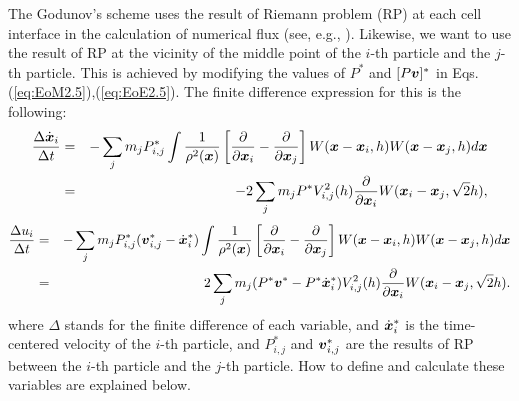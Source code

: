 \documentclass{cjour}
\newcommand{ \Vec   }[1]{ \mbox{\boldmath $ #1 $} }
\newcommand{ \PD    }[2]{ \frac{ \partial #1 }{ \partial #2 } }
\begin{document}
\begin{article}
The Godunov's scheme uses the result of 
Riemann problem (RP) at each cell interface in the calculation 
of numerical flux (see, e.g., \cite{vL:1979}).  
%
%
Likewise, we want to use the result of RP at the vicinity of 
the middle point of the $i$-th particle and the $j$-th particle. 
This is achieved by modifying the values of $P^*$ and $[P\Vec{v}]^*$ 
in Eqs. (\ref{eq:EoM2.5}),(\ref{eq:EoE2.5}).  
The finite difference expression for this is the following:
%
\begin{eqnarray}
                \frac{\Delta \dot{\Vec{x}}_i}{\Delta t} 
              & = &
              - \sum_{j} m_j
                         P^*_{i,j}
                         \int \frac{1}{ \rho^2(\Vec{x}) }
                             \left[  \PD{}{\Vec{x}_i} 
                                   - \PD{}{\Vec{x}_j}  \right]
                         W(\Vec{x}-\Vec{x}_i, h)
                         W(\Vec{x}-\Vec{x}_j, h) d\Vec{x}
                                                          \nonumber \\
              & = &
              - 2 \sum_{j} m_j 
                         P^*V^2_{i,j} (h)
                         \PD{}{\Vec{x}_i} 
                         W(\Vec{x}_i-\Vec{x}_j, \sqrt{2}h) ,
                                                        \label{eq:EoM5}
\end{eqnarray}
%
\begin{eqnarray}
                \frac{\Delta u_i}{\Delta t} 
              & = &
               - \sum_{j} m_j
                     P^*_{i,j} ( \Vec{v}^*_{i,j} - \dot{\Vec{x}}^*_i ) 
                          \int \frac{1}{ \rho^2(\Vec{x}) }
                              \left[  \PD{}{\Vec{x}_i} 
                                    - \PD{}{\Vec{x}_j}  \right]
                          W(\Vec{x}-\Vec{x}_i, h)
                          W(\Vec{x}-\Vec{x}_j, h) d\Vec{x} 
                                                          \nonumber \\
              & = &
          2 \sum_j m_j 
           ( P^*\Vec{v}^* - P^* \dot{\Vec{x}}_i^*) 
                         V^2_{i,j} (h)
                         \PD{}{\Vec{x}_i} 
                         W(\Vec{x}_i-\Vec{x}_j, \sqrt{2}h) .  
                                                    \label{eq:EoE5}
\end{eqnarray}
where $\Delta$ stands for the finite difference of each variable, 
and $\dot{\Vec{x}}^*_i$ is the time-centered velocity of 
the $i$-th particle, 
and $P^*_{i,j}$ and $\Vec{v}^*_{i,j}$ are the results of RP 
between the $i$-th particle and the $j$-th particle.  
%
How to define and calculate these variables are 
explained below. 


\end{article}
\end{document}
